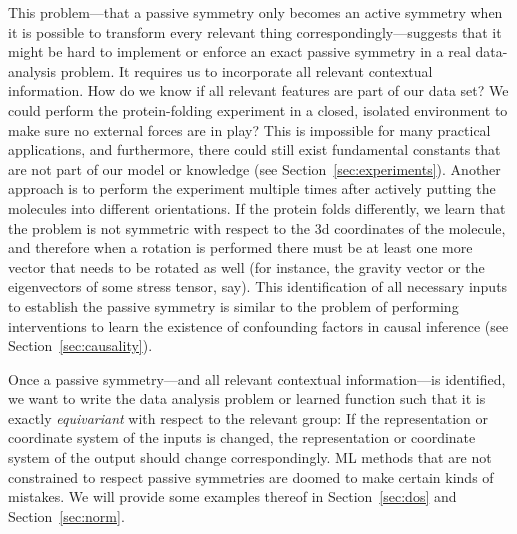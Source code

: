 \documentclass[]{article} %
\newcommand{\sectionname}{Section}
\newcommand{\secref}[1]{\sectionname~\ref{#1}}
\begin{document}
This problem---that a passive symmetry only becomes an active symmetry when it is possible to transform every relevant thing correspondingly---suggests that it might be hard to implement or enforce an exact passive symmetry in a real data-analysis problem.
It requires us to incorporate all relevant contextual information.
How do we know if all relevant features are part of our data set?
We could perform the protein-folding experiment in a closed, isolated environment to make sure no external forces are in play?
This is impossible for many practical applications, and furthermore, there could still exist fundamental constants that are not part of our model or knowledge (see \secref{sec:experiments}).
Another approach is to perform the experiment multiple times after actively putting the molecules into different orientations.
If the protein folds differently, we learn that the problem is not symmetric with respect to the 3d coordinates of the molecule, and therefore when a rotation is performed there must be at least one more vector that needs to be rotated as well (for instance, the gravity vector or the eigenvectors of some stress tensor, say).
This identification of all necessary inputs to establish the passive symmetry is similar to the problem of performing interventions to learn the existence of confounding factors in causal inference (see \secref{sec:causality}).

Once a passive symmetry---and all relevant contextual information---is identified, we want to write the data analysis problem or learned function such that it is exactly \emph{equivariant} with respect to the relevant group:
If the representation or coordinate system of the inputs is changed, the representation or coordinate system of the output should change correspondingly.
ML methods that are not constrained to respect passive symmetries are doomed to make certain kinds of mistakes.
We will provide some examples thereof in \secref{sec:dos} and \secref{sec:norm}.
\end{document}
